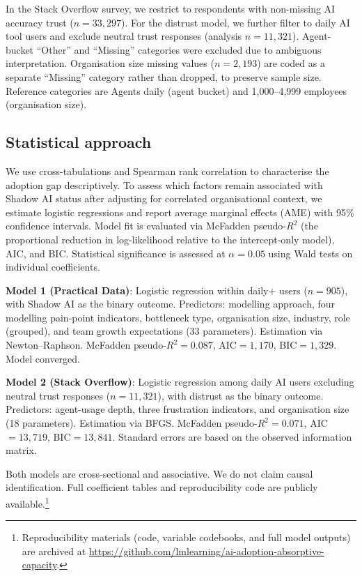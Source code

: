 \documentclass[twocolumn]{article}
\begin{document}
In the Stack Overflow survey, we restrict to respondents with non-missing AI accuracy trust ($n{=}33{,}297$). For the distrust model, we further filter to daily AI tool users and exclude neutral trust responses (analysis $n{=}11{,}321$). Agent-bucket ``Other'' and ``Missing'' categories were excluded due to ambiguous interpretation. Organisation size missing values ($n{=}2{,}193$) are coded as a separate ``Missing'' category rather than dropped, to preserve sample size. Reference categories are Agents daily (agent bucket) and 1,000--4,999 employees (organisation size).

\subsection{Statistical approach}

We use cross-tabulations and Spearman rank correlation to characterise the adoption gap descriptively. To assess which factors remain associated with Shadow AI status after adjusting for correlated organisational context, we estimate logistic regressions and report average marginal effects (AME) with 95\% confidence intervals. Model fit is evaluated via McFadden pseudo-$R^{2}$ (the proportional reduction in log-likelihood relative to the intercept-only model), AIC, and BIC. Statistical significance is assessed at $\alpha{=}0.05$ using Wald tests on individual coefficients.

\textbf{Model 1 (Practical Data)}: Logistic regression within daily+ users ($n{=}905$), with Shadow AI as the binary outcome. Predictors: modelling approach, four modelling pain-point indicators, bottleneck type, organisation size, industry, role (grouped), and team growth expectations (33 parameters). Estimation via Newton--Raphson. McFadden pseudo-$R^{2}{=}0.087$, AIC${=}1{,}170$, BIC${=}1{,}329$. Model converged.

\textbf{Model 2 (Stack Overflow)}: Logistic regression among daily AI users excluding neutral trust responses ($n{=}11{,}321$), with distrust as the binary outcome. Predictors: agent-usage depth, three frustration indicators, and organisation size (18 parameters). Estimation via BFGS. McFadden pseudo-$R^{2}{=}0.071$, AIC${=}13{,}719$, BIC${=}13{,}841$. Standard errors are based on the observed information matrix.

Both models are cross-sectional and associative. We do not claim causal identification. Full coefficient tables and reproducibility code are publicly available.\footnote{Reproducibility materials (code, variable codebooks, and full model outputs) are archived at \url{https://github.com/lmlearning/ai-adoption-absorptive-capacity}.}
\end{document}
